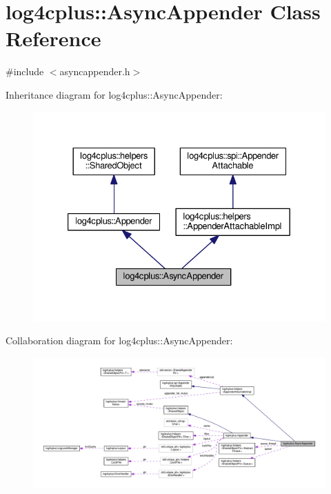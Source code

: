 \hypertarget{classlog4cplus_1_1AsyncAppender}{\section{log4cplus\-:\-:Async\-Appender Class Reference}
\label{classlog4cplus_1_1AsyncAppender}
}


{\ttfamily \#include $<$asyncappender.\-h$>$}



Inheritance diagram for log4cplus\-:\-:Async\-Appender\-:
\nopagebreak
\begin{figure}[H]
\begin{center}
\leavevmode
\includegraphics[width=329pt]{classlog4cplus_1_1AsyncAppender__inherit__graph}
\end{center}
\end{figure}


Collaboration diagram for log4cplus\-:\-:Async\-Appender\-:
\nopagebreak
\begin{figure}[H]
\begin{center}
\leavevmode
\includegraphics[width=350pt]{classlog4cplus_1_1AsyncAppender__coll__graph}
\end{center}
\end{figure}

